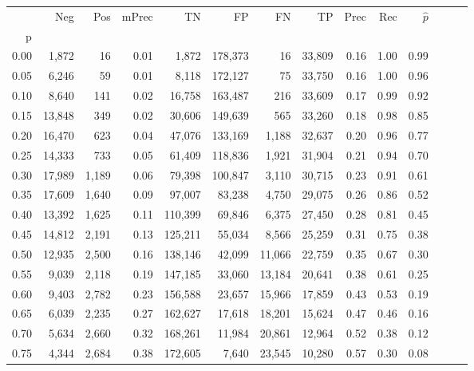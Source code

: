 \begin{tabular}{rrrrrrrrrrrrrr}
\toprule
{} &     Neg &    Pos & mPrec &       TN &       FP &      FN &      TP &  Prec &   Rec & $\hat{p}$ \\
p    &         &        &       &          &          &         &         &       &       &           \\
\midrule
0.00 &   1,872 &     16 &  0.01 &    1,872 &  178,373 &      16 &  33,809 &  0.16 &  1.00 &      0.99 \\
0.05 &   6,246 &     59 &  0.01 &    8,118 &  172,127 &      75 &  33,750 &  0.16 &  1.00 &      0.96 \\
0.10 &   8,640 &    141 &  0.02 &   16,758 &  163,487 &     216 &  33,609 &  0.17 &  0.99 &      0.92 \\
0.15 &  13,848 &    349 &  0.02 &   30,606 &  149,639 &     565 &  33,260 &  0.18 &  0.98 &      0.85 \\
0.20 &  16,470 &    623 &  0.04 &   47,076 &  133,169 &   1,188 &  32,637 &  0.20 &  0.96 &      0.77 \\
0.25 &  14,333 &    733 &  0.05 &   61,409 &  118,836 &   1,921 &  31,904 &  0.21 &  0.94 &      0.70 \\
0.30 &  17,989 &  1,189 &  0.06 &   79,398 &  100,847 &   3,110 &  30,715 &  0.23 &  0.91 &      0.61 \\
0.35 &  17,609 &  1,640 &  0.09 &   97,007 &   83,238 &   4,750 &  29,075 &  0.26 &  0.86 &      0.52 \\
0.40 &  13,392 &  1,625 &  0.11 &  110,399 &   69,846 &   6,375 &  27,450 &  0.28 &  0.81 &      0.45 \\
0.45 &  14,812 &  2,191 &  0.13 &  125,211 &   55,034 &   8,566 &  25,259 &  0.31 &  0.75 &      0.38 \\
0.50 &  12,935 &  2,500 &  0.16 &  138,146 &   42,099 &  11,066 &  22,759 &  0.35 &  0.67 &      0.30 \\
0.55 &   9,039 &  2,118 &  0.19 &  147,185 &   33,060 &  13,184 &  20,641 &  0.38 &  0.61 &      0.25 \\
0.60 &   9,403 &  2,782 &  0.23 &  156,588 &   23,657 &  15,966 &  17,859 &  0.43 &  0.53 &      0.19 \\
0.65 &   6,039 &  2,235 &  0.27 &  162,627 &   17,618 &  18,201 &  15,624 &  0.47 &  0.46 &      0.16 \\
0.70 &   5,634 &  2,660 &  0.32 &  168,261 &   11,984 &  20,861 &  12,964 &  0.52 &  0.38 &      0.12 \\
0.75 &   4,344 &  2,684 &  0.38 &  172,605 &    7,640 &  23,545 &  10,280 &  0.57 &  0.30 &      0.08 \\

\end{tabular}
